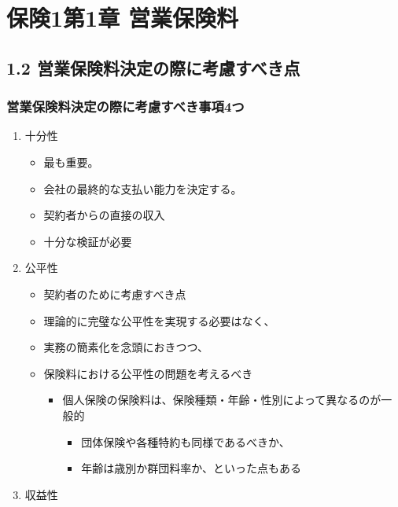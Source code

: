 \documentclass[report,gutter=10mm,fore-edge=10mm,uplatex,dvipdfmx]{jlreq}
\begin{document}
\chapter{保険1第1章 営業保険料}

\section{1.2 営業保険料決定の際に考慮すべき点}

\subsection{営業保険料決定の際に考慮すべき事項4つ}


\begin{enumerate}
    \tightlist
\item  十分性
  \begin{itemize}
    \tightlist
  \item
    最も重要。
  \item
    会社の最終的な支払い能力を決定する。
  \item
    契約者からの直接の収入
  \item
    十分な検証が必要
  \end{itemize}
\item
  公平性

  \begin{itemize}
    \tightlist
  \item
    契約者のために考慮すべき点
  \item
    理論的に完璧な公平性を実現する必要はなく、
  \item
    実務の簡素化を念頭におきつつ、
  \item
    保険料における公平性の問題を考えるべき

    \begin{itemize}
    \tightlist
    \item
      個人保険の保険料は、保険種類・年齢・性別によって異なるのが一般的

      \begin{itemize}
      \tightlist
      \item
        団体保険や各種特約も同様であるべきか、
      \item
        年齢は歳別か群団料率か、といった点もある
      \end{itemize}
    \end{itemize}
  \end{itemize}
\item
  収益性


\end{enumerate}
\end{document}
